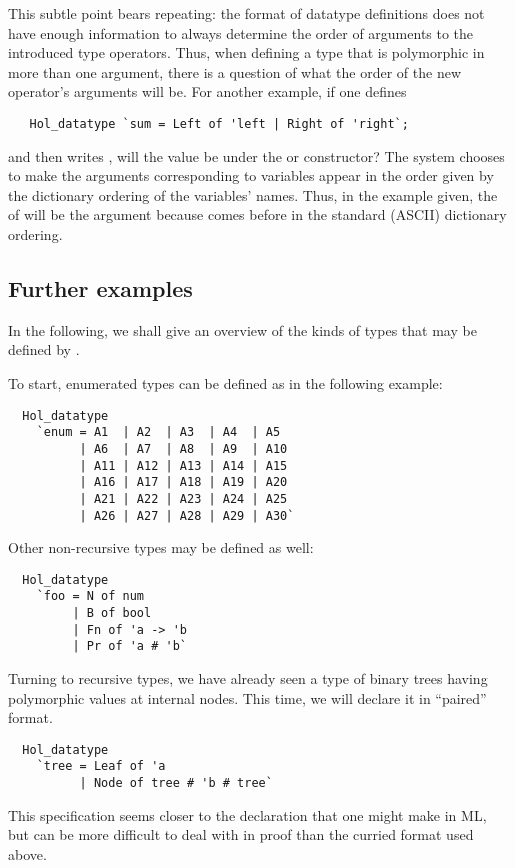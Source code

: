 This subtle point bears repeating: the format of datatype definitions
does not have enough information to always determine the order of
arguments to the introduced type operators. Thus, when defining a type
that is polymorphic in more than one argument, there is a question of
what the order of the new operator's arguments will be.  For another
example, if one defines
%
\begin{hol}
\begin{verbatim}
   Hol_datatype `sum = Left of 'left | Right of 'right`;
\end{verbatim}
\end{hol}
%
and then writes , will the  value be under the
 or  constructor?  The system chooses to make the
arguments corresponding to variables appear in the order given by the
dictionary ordering of the variables' names.  Thus, in the example
given, the  of  will be the  argument
because  comes before  in the standard (ASCII)
dictionary ordering.

\subsection{Further examples}

 In the following, we shall give an overview of the kinds of types that
 may be defined by .

 To start, enumerated types can be defined as in the following example:
\begin{hol}
\begin{verbatim}
  Hol_datatype
    `enum = A1  | A2  | A3  | A4  | A5
          | A6  | A7  | A8  | A9  | A10
          | A11 | A12 | A13 | A14 | A15
          | A16 | A17 | A18 | A19 | A20
          | A21 | A22 | A23 | A24 | A25
          | A26 | A27 | A28 | A29 | A30`
\end{verbatim}
\end{hol}
%
Other non-recursive types may be defined as well:
\begin{hol}
\begin{verbatim}
  Hol_datatype
    `foo = N of num
         | B of bool
         | Fn of 'a -> 'b
         | Pr of 'a # 'b`
\end{verbatim}
\end{hol}
%
Turning to recursive types, we have already seen a type of binary
trees having polymorphic values at internal nodes. This time, we will
declare it in ``paired'' format.
\begin{hol}
\begin{verbatim}
  Hol_datatype
    `tree = Leaf of 'a
          | Node of tree # 'b # tree`
\end{verbatim}
\end{hol}
%
This specification seems closer to the declaration that one might make
in ML, but can be more difficult to deal with in proof than the curried format
used above.

